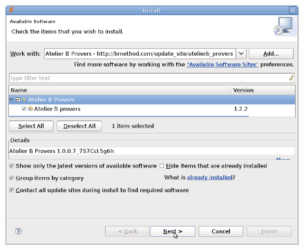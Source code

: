 \begin{figure}[!h]
\begin{center}
	\includegraphics{img/tutorial/tut_02_install3.png}
\end{center}
\end{figure}

